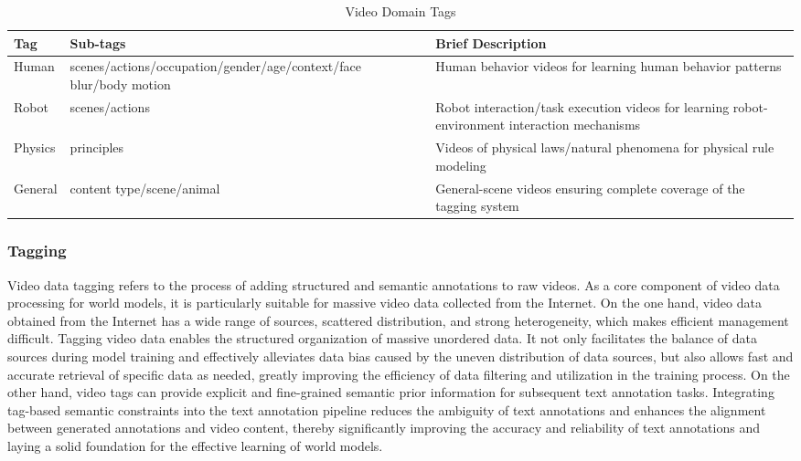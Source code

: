 \begin{table}[t]
\centering
\caption{Video Domain Tags}
\label{tab:video_domain}
\footnotesize %
\renewcommand{\arraystretch}{1.3} %
\begin{tabular}{M{2cm} M{3.5cm} Y}
\toprule
\textbf{Tag} & \textbf{Sub-tags} & \textbf{Brief Description} \\
\midrule
Human & scenes/actions/occupation/\allowbreak gender/age/context/\allowbreak face blur/body motion & Human behavior videos for learning human behavior patterns \\

Robot & scenes/actions & Robot interaction/task execution videos for learning robot-environment interaction mechanisms \\

Physics & principles & Videos of physical laws/natural phenomena for physical rule modeling \\
General & content type/scene/animal & General-scene videos ensuring complete coverage of the tagging system \\


\bottomrule
\end{tabular}
\end{table}






\subsubsection{Tagging}
Video data tagging refers to the process of adding structured and semantic annotations to raw videos. As a core component of video data processing for world models, it is particularly suitable for massive video data collected from the Internet.
On the one hand, video data obtained from the Internet has a wide range of sources, scattered distribution, and strong heterogeneity, which makes efficient management difficult. Tagging video data enables the structured organization of massive unordered data. It not only facilitates the balance of data sources during model training and effectively alleviates data bias caused by the uneven distribution of data sources, but also allows fast and accurate retrieval of specific data as needed, greatly improving the efficiency of data filtering and utilization in the training process.
On the other hand, video tags can provide explicit and fine-grained semantic prior information for subsequent text annotation tasks. Integrating tag-based semantic constraints into the text annotation pipeline reduces the ambiguity of text annotations and enhances the alignment between generated annotations and video content, thereby significantly improving the accuracy and reliability of text annotations and laying a solid foundation for the effective learning of world models.


